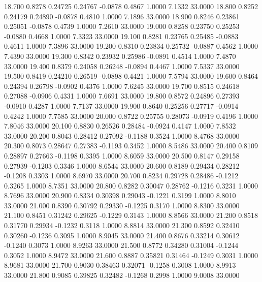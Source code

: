   18.700   0.8278   0.24725   0.24767  -0.0878   0.4867   1.0000   7.1332  33.0000
  18.800   0.8252   0.24179   0.24890  -0.0878   0.4810   1.0000   7.1896  33.0000
  18.900   0.8246   0.23861   0.25051  -0.0878   0.4739   1.0000   7.2610  33.0000
  19.000   0.8258   0.23750   0.25253  -0.0880   0.4668   1.0000   7.3323  33.0000
  19.100   0.8281   0.23765   0.25485  -0.0883   0.4611   1.0000   7.3896  33.0000
  19.200   0.8310   0.23834   0.25732  -0.0887   0.4562   1.0000   7.4390  33.0000
  19.300   0.8342   0.23932   0.25986  -0.0891   0.4514   1.0000   7.4870  33.0000
  19.400   0.8379   0.24058   0.26248  -0.0894   0.4467   1.0000   7.5337  33.0000
  19.500   0.8419   0.24210   0.26519  -0.0898   0.4421   1.0000   7.5794  33.0000
  19.600   0.8464   0.24394   0.26798  -0.0902   0.4376   1.0000   7.6245  33.0000
  19.700   0.8515   0.24618   0.27088  -0.0906   0.4331   1.0000   7.6691  33.0000
  19.800   0.8572   0.24896   0.27393  -0.0910   0.4287   1.0000   7.7137  33.0000
  19.900   0.8640   0.25256   0.27717  -0.0914   0.4242   1.0000   7.7585  33.0000
  20.000   0.8722   0.25755   0.28073  -0.0919   0.4196   1.0000   7.8046  33.0000
  20.100   0.8830   0.26526   0.28484  -0.0924   0.4147   1.0000   7.8532  33.0000
  20.200   0.8043   0.28412   0.27092  -0.1188   0.3524   1.0000   8.4768  33.0000
  20.300   0.8073   0.28647   0.27383  -0.1193   0.3452   1.0000   8.5486  33.0000
  20.400   0.8109   0.28897   0.27663  -0.1198   0.3395   1.0000   8.6059  33.0000
  20.500   0.8147   0.29158   0.27939  -0.1203   0.3346   1.0000   8.6544  33.0000
  20.600   0.8189   0.29434   0.28212  -0.1208   0.3303   1.0000   8.6970  33.0000
  20.700   0.8234   0.29728   0.28486  -0.1212   0.3265   1.0000   8.7351  33.0000
  20.800   0.8282   0.30047   0.28762  -0.1216   0.3231   1.0000   8.7696  33.0000
  20.900   0.8334   0.30398   0.29043  -0.1221   0.3199   1.0000   8.8010  33.0000
  21.000   0.8390   0.30792   0.29330  -0.1225   0.3170   1.0000   8.8300  33.0000
  21.100   0.8451   0.31242   0.29625  -0.1229   0.3143   1.0000   8.8566  33.0000
  21.200   0.8518   0.31770   0.29934  -0.1232   0.3118   1.0000   8.8814  33.0000
  21.300   0.8592   0.32410   0.30260  -0.1236   0.3095   1.0000   8.9045  33.0000
  21.400   0.8676   0.33214   0.30612  -0.1240   0.3073   1.0000   8.9263  33.0000
  21.500   0.8772   0.34280   0.31004  -0.1244   0.3052   1.0000   8.9472  33.0000
  21.600   0.8887   0.35821   0.31464  -0.1249   0.3031   1.0000   8.9681  33.0000
  21.700   0.9030   0.38463   0.32071  -0.1258   0.3008   1.0000   8.9913  33.0000
  21.800   0.9085   0.39825   0.32482  -0.1268   0.2998   1.0000   9.0008  33.0000
